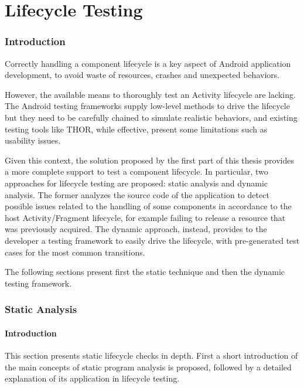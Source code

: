 \documentclass[11pt,a4paper,notitlepage]{article}
\begin{document}

\newpage
\part{Lifecycle Testing}\label{part_lifecycle}

\section{Introduction}
Correctly handling a component lifecycle is a key aspect of Android application development, to avoid waste of resources, crashes and unexpected behaviors.

However, the available means to thoroughly test an Activity lifecycle are lacking. The Android testing frameworks supply low-level methods to drive the lifecycle but they need to be carefully chained to simulate realistic behaviors, and existing testing tools like THOR, while effective, present some limitations such as usability issues.

Given this context, the solution proposed by the first part of this thesis provides a more complete support to test a component lifecycle. In particular, two approaches for lifecycle testing are proposed: static analysis and dynamic analysis. The former analyzes the source code of the application to detect possible issues related to the handling of some components in accordance to the host Activity/Fragment lifecycle, for example failing to release a resource that was previously acquired. The dynamic approach, instead, provides to the developer a testing framework to easily drive the lifecycle, with pre-generated test cases for the most common transitions.

The following sections present first the static technique and then the dynamic testing framework.

\section{Static Analysis}\label{section_lifecycle_static}

\subsection{Introduction}
This section presents static lifecycle checks in depth. First a short introduction of the main concepts of static program analysis is proposed, followed by a detailed explanation of its application in lifecycle testing.
\end{document}
